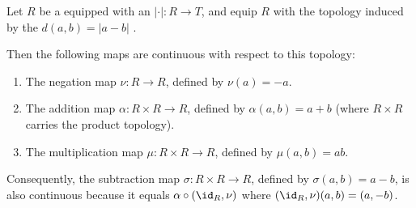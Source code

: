 \begin{proposition} \label{proposition:commutative_ring_with_absolute_value_valued_in_ordered_semiring_has_continuous_algebraic_operations_under_metric_topology}
    Let $R$ be a  equipped with an  $|\cdot| : R \to T$, and equip $R$ with the topology induced by the  $d(a,b) = |a - b|$ .

    Then the following maps are continuous with respect to this topology:
    \begin{enumerate}
        \item The negation map $\nu : R \to R$, defined by $\nu(a) = -a$.
        \item The addition map $\alpha : R \times R \to R$, defined by $\alpha(a,b) = a + b$ (where $R \times R$ carries the product topology).
        \item The multiplication map $\mu : R \times R \to R$, defined by $\mu(a,b) = ab$.
    \end{enumerate}

    Consequently, the subtraction map $\sigma : R \times R \to R$, defined by $\sigma(a,b) = a - b$, is also continuous because it equals $\alpha \circ (\id_R, \nu)$ where $(\id_R, \nu)(a,b) = (a, -b)$.
\end{proposition}

